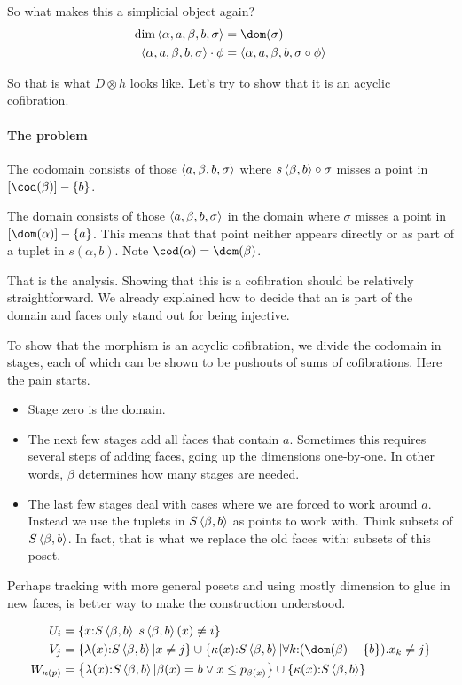 \documentclass[csh.tex]{subfiles}
\begin{document}
So what makes this a simplicial object again? 
\begin{align*}
\dim\tuplet{\alpha,a,\beta,b,\sigma} &= \dom(\sigma)\\
\tuplet{\alpha,a,\beta,b,\sigma}\cdot\phi &= \tuplet{\alpha,a,\beta,b,\sigma\circ \phi}
\end{align*}

So that is what $D\otimes h$ looks like. Let's try to show that it is an acyclic cofibration.

\paragraph{The problem}
The codomain consists of those $\left\langle a,\beta,b,\sigma \right\rangle$ where $s\left\langle \beta,b \right\rangle\circ\sigma$ misses a point in $[\cod(\beta)]-\set b$.

The domain consists of those $\left\langle a,\beta,b,\sigma \right\rangle$ in the domain where $\sigma$ misses a point in $[\dom(\alpha)] -\set a$. This means that that point neither appears directly or as part of a tuplet in $s(\alpha,b)$. Note $\cod(\alpha) = \dom(\beta)$.

That is the analysis. Showing that this is a cofibration should be relatively straightforward. We already explained how to decide that an
is part of the domain and faces only stand out for being injective.

To show that the morphism is an acyclic cofibration, we divide the
codomain in stages, each of which can be shown to be pushouts of sums
of cofibrations. Here the pain starts.
\begin{itemize}
\item Stage zero is the domain. 
\item The next few stages add all faces that contain $a$. Sometimes this requires several steps of adding faces, going up the dimensions one-by-one. In other words, $\beta$ determines how many stages are needed.
\item The last few stages deal with cases where we are forced to work around $a$. Instead we use the tuplets in $S\left\langle \beta,b \right\rangle$ as points to work with.
Think subsets of $S\left\langle \beta,b \right\rangle$. In fact, that is what we replace the old faces with: subsets of this poset.
\end{itemize}

Perhaps tracking with more general posets and using mostly dimension to glue in new faces, is better way to make the construction understood.

\begin{align*}
U_i &= \set{x\of S\tuplet{\beta,b} | s\tuplet{\beta,b}(x) \neq i } \\
V_j &= \set{\lambda(x)\of S\tuplet{\beta,b} | x \neq j }\cup\set{\kappa(x)\of S\tuplet{\beta,b}| \forall k\of(\dom(\beta)-\set b). x_k\neq j } \\
W_{\kappa(p)} &= \set{\lambda(x)\of S\tuplet{\beta,b} | \beta(x) = b \vee x \leq p_{\beta(x)} }\cup\set{\kappa(x)\of S\tuplet{\beta,b}} \\
\end{align*}
\end{document}

